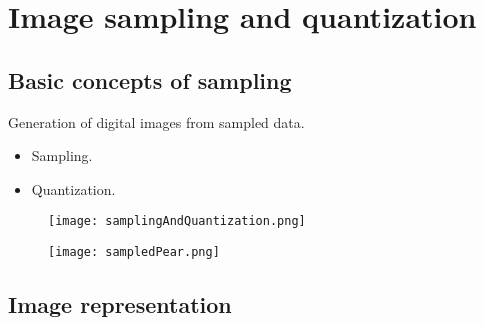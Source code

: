 
\section{Image sampling and quantization}


\subsection{Basic concepts of sampling}


\begin{frame}
Generation of digital images from sampled data.
\begin{itemize}
\item Sampling.
\item Quantization.
\end{itemize}
\begin{figure}
\texttt{[image: samplingAndQuantization.png]}
\end{figure}
\end{frame}


\begin{frame}
\begin{figure}
\texttt{[image: sampledPear.png]}
\end{figure}
\end{frame}


\subsection{Image representation}


